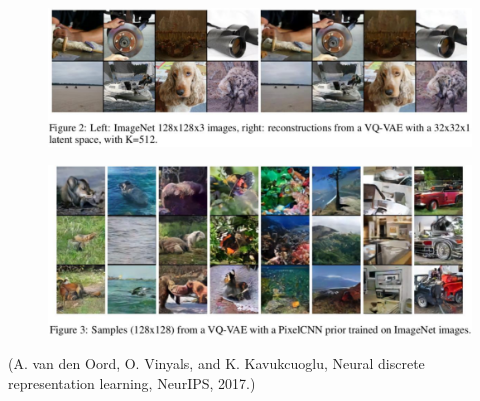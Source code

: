 \begin{concept}[11.23][VQ-VAE]
    \begin{figure}[H]
        \centering
        \includegraphics[width=1.0\textwidth]{.././assets/11.8.png}
    \end{figure}

    \begin{figure}[H]
        \centering
        \includegraphics[width=1.0\textwidth]{.././assets/11.9.png}
    \end{figure}

    (A. van den Oord, O. Vinyals, and K. Kavukcuoglu, Neural discrete representation learning, NeurIPS, 2017.)
\end{concept}

